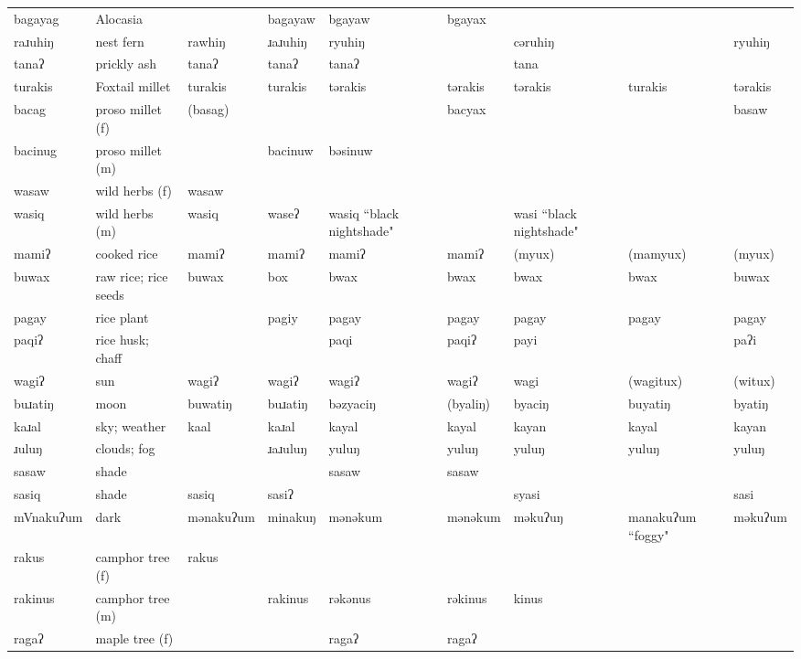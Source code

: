 \begin{landscape}
\begin{longtable}{*{9}{p{}}}
\text{*}bagayag & Alocasia &  & bagayaw & bgayaw & bgayax &  &  & \\
\text{*}raɹuhiŋ & nest fern & rawhiŋ & ɹaɹuhiŋ & ryuhiŋ &  & cəruhiŋ &  & ryuhiŋ\\
\text{*}tanaʔ & prickly ash & tanaʔ & tanaʔ & tanaʔ &  & tana &  & \\
\text{*}turakis & Foxtail millet & turakis & turakis & tərakis & tərakis & tərakis & turakis & tərakis\\
\text{*}bacag & proso millet (f) & (basag) &  &  & bacyax &  &  & basaw\\
\text{*}bacinug & proso millet (m) &  & bacinuw & bəsinuw &  &  &  & \\
\text{*}wasaw & wild herbs (f) & wasaw &  &  &  &  &  & \\
\text{*}wasiq & wild herbs (m) & wasiq & waseʔ & wasiq ``black nightshade" &  & wasi ``black nightshade" &  & \\
\text{*}mamiʔ & cooked rice & mamiʔ & mamiʔ & mamiʔ & mamiʔ & (myux) & (mamyux) & (myux)\\
\text{*}buwax & raw rice; rice seeds & buwax & box & bwax & bwax & bwax & bwax & buwax\\
\text{*}pagay & rice plant &  & pagiy & pagay & pagay & pagay & pagay & pagay\\
\text{*}paqiʔ & rice husk; chaff &  &  & paqi & paqiʔ & payi &  & paʔi\\
\text{*}wagiʔ & sun & wagiʔ & wagiʔ & wagiʔ & wagiʔ & wagi & (wagitux) & (witux)\\
\text{*}buɹatiŋ & moon & buwatiŋ & buɹatiŋ & bəzyaciŋ & (byaliŋ) & byaciŋ & buyatiŋ & byatiŋ\\
\text{*}kaɹal & sky; weather & kaal & kaɹal & kayal & kayal & kayan & kayal & kayan\\
\text{*}ɹuluŋ & clouds; fog &  & ɹaɹuluŋ & yuluŋ & yuluŋ & yuluŋ & yuluŋ & yuluŋ\\
\text{*}sasaw & shade &  &  & sasaw & sasaw &  &  & \\
\text{*}sasiq & shade & sasiq & sasiʔ &  &  & syasi &  & sasi\\
\text{*}mVnakuʔum & dark & mənakuʔum & minakuŋ & mənəkum & mənəkum & məkuʔuŋ & manakuʔum ``foggy" & məkuʔum\\
\text{*}rakus & camphor tree (f) & rakus &  &  &  &  &  & \\
\text{*}rakinus & camphor tree (m) &  & rakinus & rəkənus & rəkinus & kinus &  & \\
\text{*}ragaʔ & maple tree (f) &  &  & ragaʔ & ragaʔ &  &  & \\

\end{longtable}
\end{landscape}
